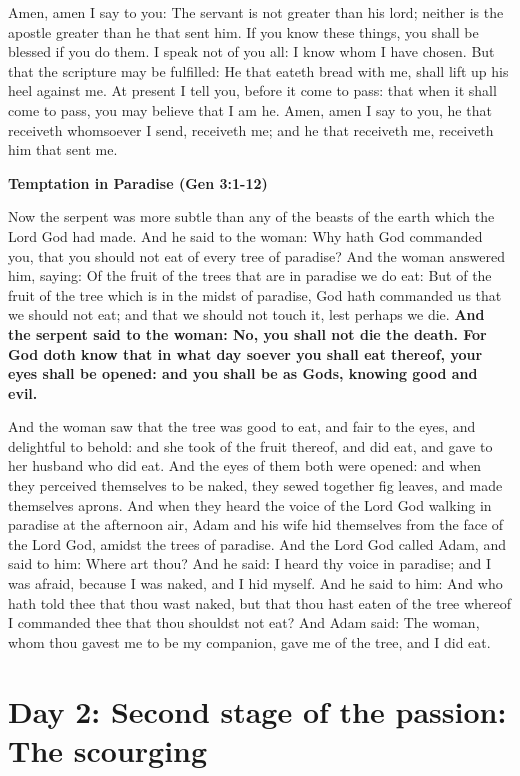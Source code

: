 Amen, amen I say to you: The servant is not greater than his lord; neither is the apostle greater than he that sent him. If you know these things, you shall be blessed if you do them. I speak not of you all: I know whom I have chosen. But that the scripture may be fulfilled: He that eateth bread with me, shall lift up his heel against me. At present I tell you, before it come to pass: that when it shall come to pass, you may believe that I am he. Amen, amen I say to you, he that receiveth whomsoever I send, receiveth me; and he that receiveth me, receiveth him that sent me.

\textbf{Temptation in Paradise (Gen 3:1-12)}

Now the serpent was more subtle than any of the beasts of the earth which the Lord God had made. And he said to the woman: Why hath God commanded you, that you should not eat of every tree of paradise? And the woman answered him, saying: Of the fruit of the trees that are in paradise we do eat: But of the fruit of the tree which is in the midst of paradise, God hath commanded us that we should not eat; and that we should not touch it, lest perhaps we die. \textbf{And the serpent said to the woman: No, you shall not die the death. For God doth know that in what day soever you shall eat thereof, your eyes shall be opened: and you shall be as Gods, knowing good and evil.}

And the woman saw that the tree was good to eat, and fair to the eyes, and delightful to behold: and she took of the fruit thereof, and did eat, and gave to her husband who did eat. And the eyes of them both were opened: and when they perceived themselves to be naked, they sewed together fig leaves, and made themselves aprons. And when they heard the voice of the Lord God walking in paradise at the afternoon air, Adam and his wife hid themselves from the face of the Lord God, amidst the trees of paradise. And the Lord God called Adam, and said to him: Where art thou? And he said: I heard thy voice in paradise; and I was afraid, because I was naked, and I hid myself. And he said to him: And who hath told thee that thou wast naked, but that thou hast eaten of the tree whereof I commanded thee that thou shouldst not eat? And Adam said: The woman, whom thou gavest me to be my companion, gave me of the tree, and I did eat.

\section{Day 2: Second stage of the passion: The scourging}


